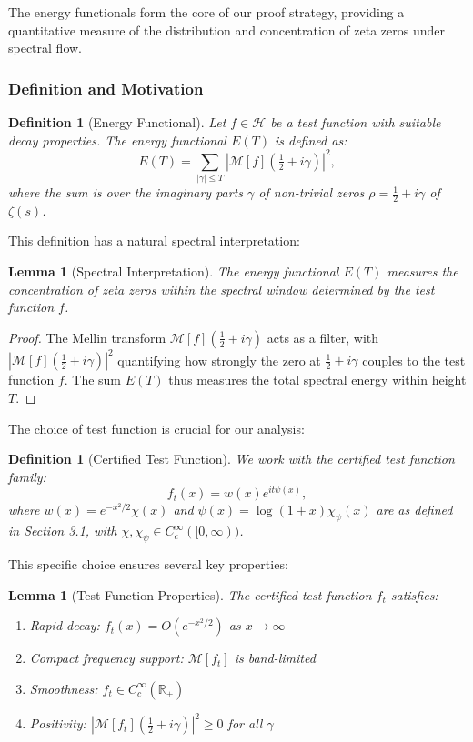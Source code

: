 \documentclass[11pt,hyp,]{nyjm}
\newtheorem{lemma}[theorem]{Lemma}
\newtheorem{definition}[theorem]{Definition}
\begin{document}
The energy functionals form the core of our proof strategy, providing a quantitative measure of the distribution and concentration of zeta zeros under spectral flow.

\subsubsection{Definition and Motivation}

\begin{definition}[Energy Functional]\label{def:energy-functional}
Let $f \in \mathcal{H}$ be a test function with suitable decay properties. The \emph{energy functional} $E(T)$ is defined as:
\[
E(T) = \sum_{|\gamma| \leq T} |\mathcal{M}[f](\tfrac12 + i\gamma)|^2,
\]
where the sum is over the imaginary parts $\gamma$ of non-trivial zeros $\rho = \tfrac12 + i\gamma$ of $\zeta(s)$.
\end{definition}

This definition has a natural spectral interpretation:

\begin{lemma}[Spectral Interpretation]\label{lem:energy-spectral}
The energy functional $E(T)$ measures the concentration of zeta zeros within the spectral window determined by the test function $f$.
\end{lemma}

\begin{proof}
The Mellin transform $\mathcal{M}[f](\tfrac12 + i\gamma)$ acts as a filter, with $|\mathcal{M}[f](\tfrac12 + i\gamma)|^2$ quantifying how strongly the zero at $\tfrac12 + i\gamma$ couples to the test function $f$. The sum $E(T)$ thus measures the total spectral energy within height $T$.
\end{proof}

The choice of test function is crucial for our analysis:

\begin{definition}[Certified Test Function]\label{def:certified-test}
We work with the certified test function family:
\[
f_t(x) = w(x) e^{it\psi(x)},
\]
where $w(x) = e^{-x^2/2}\chi(x)$ and $\psi(x) = \log(1+x)\chi_\psi(x)$ are as defined in Section 3.1, with $\chi, \chi_\psi \in C_c^\infty([0,\infty))$.
\end{definition}

This specific choice ensures several key properties:

\begin{lemma}[Test Function Properties]\label{lem:test-properties}
The certified test function $f_t$ satisfies:
\begin{enumerate}
\item Rapid decay: $f_t(x) = O(e^{-x^2/2})$ as $x \to \infty$
\item Compact frequency support: $\mathcal{M}[f_t]$ is band-limited
\item Smoothness: $f_t \in C_c^\infty(\mathbb{R}_+)$
\item Positivity: $|\mathcal{M}[f_t](\tfrac12 + i\gamma)|^2 \geq 0$ for all $\gamma$
\end{enumerate}
\end{lemma}
\end{document}
